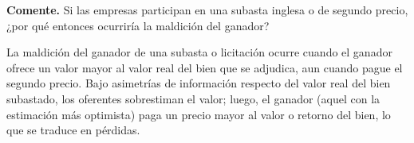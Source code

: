 \question \textbf{Comente.} Si las empresas participan en una subasta inglesa o de segundo precio, ¿por qué entonces ocurriría la maldición del ganador?
\begin{solution}
La maldición del ganador de una subasta o licitación ocurre cuando el ganador ofrece un valor mayor al valor real del bien que se adjudica, aun cuando pague el segundo precio. Bajo asimetrías de información respecto del valor real del bien subastado, los oferentes sobrestiman el valor; luego, el ganador (aquel con la estimación más optimista) paga un precio mayor al valor o retorno del bien, lo que se traduce en pérdidas.

\end{solution}
